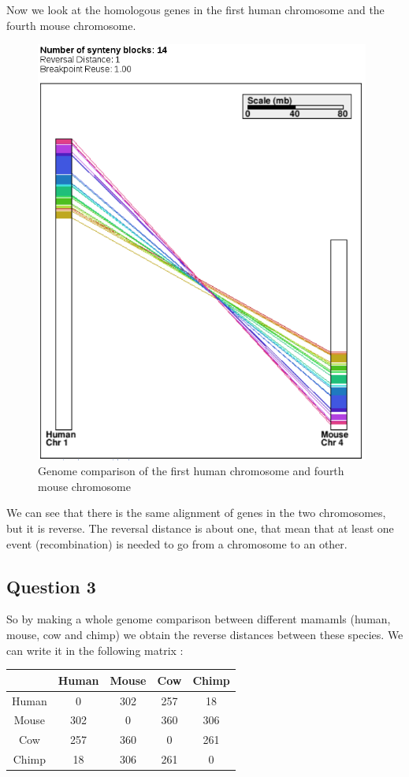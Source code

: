 \documentclass[]{article}
\theoremstyle{definition}
\begin{document}
Now we look at the homologous genes in the first human chromosome and the fourth mouse chromosome.
\begin{figure}[H]
	\includegraphics*[width = 11cm]{../H1_M4.png}
	\caption{\label{h1_m4} Genome comparison of the first human chromosome and fourth mouse chromosome }
\end{figure}
	We can see that there is the same alignment of genes in the two chromosomes, but it is reverse. The reversal distance is about one, that mean that at least one event (recombination) is needed to go from a chromosome to an other.   

\subsection{Question 3}

	So by making a whole genome comparison between different mamamls (human, mouse, cow and chimp) we obtain the reverse distances between these species. We can write it in the following matrix :
	\\
	
\begin{tabular}{|*{5}{c|}}
	\hline
	   & Human  & Mouse  & Cow  & Chimp \\
	\hline
	Human  & 0  & 302  & 257  & 18 \\
	\hline
	Mouse  & 302  & 0  & 360 & 306 \\
	\hline
	Cow  & 257  & 360 & 0 & 261 \\
	\hline
	Chimp  & 18 & 306 & 261 & 0 \\
	\hline
	
\end{tabular}
\end{document}

